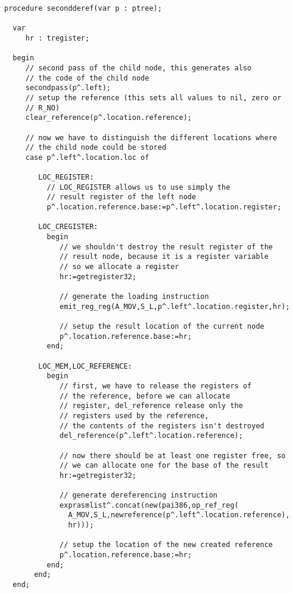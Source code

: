 \documentclass{report}
\begin{document}
\begin{verbatim}
procedure secondderef(var p : ptree);

  var
     hr : tregister;

  begin
     // second pass of the child node, this generates also
     // the code of the child node
     secondpass(p^.left);
     // setup the reference (this sets all values to nil, zero or
     // R_NO)
     clear_reference(p^.location.reference);

     // now we have to distinguish the different locations where
     // the child node could be stored
     case p^.left^.location.loc of

        LOC_REGISTER:
          // LOC_REGISTER allows us to use simply the
          // result register of the left node
          p^.location.reference.base:=p^.left^.location.register;

        LOC_CREGISTER:
          begin
             // we shouldn't destroy the result register of the
             // result node, because it is a register variable
             // so we allocate a register
             hr:=getregister32;

             // generate the loading instruction
             emit_reg_reg(A_MOV,S_L,p^.left^.location.register,hr);

             // setup the result location of the current node
             p^.location.reference.base:=hr;
          end;

        LOC_MEM,LOC_REFERENCE:
          begin
             // first, we have to release the registers of
             // the reference, before we can allocate
             // register, del_reference release only the
             // registers used by the reference,
             // the contents of the registers isn't destroyed
             del_reference(p^.left^.location.reference);

             // now there should be at least one register free, so
             // we can allocate one for the base of the result
             hr:=getregister32;

             // generate dereferencing instruction
             exprasmlist^.concat(new(pai386,op_ref_reg(
               A_MOV,S_L,newreference(p^.left^.location.reference),
               hr)));

             // setup the location of the new created reference
             p^.location.reference.base:=hr;
          end;
       end;
  end;
\end{verbatim}
\end{document}
